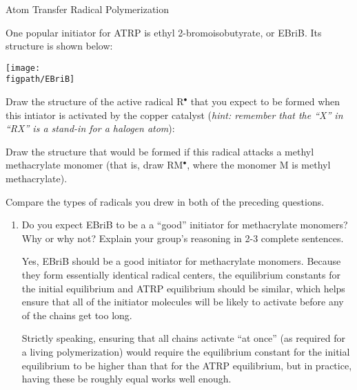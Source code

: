 \begin{activity}{Atom Transfer Radical Polymerization}
\begin{ctqs}
\end{ctqs}

\begin{infobox}
	One popular initiator for ATRP is ethyl 2-bromoisobutyrate, or EBriB.  Its structure is shown below:
	
	\centerline{\texttt{[image: \\figpath/EBriB]}}
\end{infobox}

\begin{ctqs}
	\question Draw the structure of the active radical R$^\bullet$ that you expect to be formed when this intiator is activated by the copper catalyst (\emph{hint: remember that the ``X'' in ``RX'' is a stand-in for a halogen atom}):
	
		\begin{solution}[0.5in]
		\studentdisplay{~}
		\end{solution}
	
	\question Draw the structure that would be formed if this radical attacks a methyl methacrylate monomer (that is, draw RM$^\bullet$, where the monomer M is methyl methacrylate). \label{\labelbase:ctq:ATRPprop}
	
		\begin{solution}[1in]
		\studentdisplay{~}
		\end{solution}
	
	\question Compare the types of radicals you drew in both of the preceding questions.
	
		\begin{enumerate}
			\item Do you expect EBriB to be a a ``good'' initiator for methacrylate monomers?  Why or why not?  Explain your group's reasoning in 2-3 complete sentences.
	
			\begin{solution}[1.25in]
				Yes, EBriB should be a good initiator for methacrylate monomers.  Because they form essentially identical radical centers, the equilibrium constants for the initial equilibrium and ATRP equilibrium should be similar, which helps ensure that all of the initiator molecules will be likely to activate before any of the chains get too long.
				
				Strictly speaking, ensuring that all chains activate ``at once'' (as required for a living polymerization) would require the equilibrium constant for the initial equilibrium to be higher than that for the ATRP equilibrium, but in practice, having these be roughly equal works well enough.
			\end{solution}
			

\end{enumerate}
\end{ctqs}
\end{activity}
